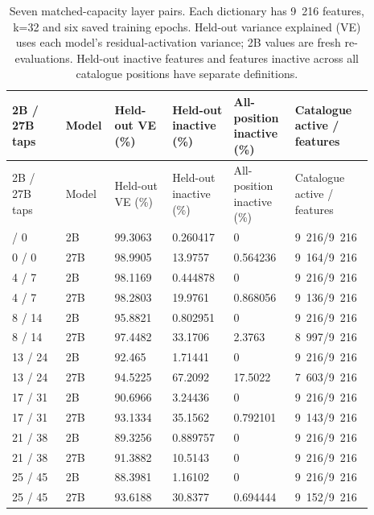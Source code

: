 \begin{longtable}{@{}L{0.14\linewidth}L{0.08\linewidth}L{0.15\linewidth}L{0.16\linewidth}L{0.16\linewidth}L{0.2\linewidth}@{}}
\caption{Seven matched-capacity layer pairs. Each dictionary has 9~216 features, k=32 and six saved training epochs. Held-out variance explained (VE) uses each model's residual-activation variance; 2B values are fresh re-evaluations. Held-out inactive features and features inactive across all catalogue positions have separate definitions.}\\
\toprule
2B / 27B taps & Model & Held-out VE (\%) & Held-out inactive (\%) & All-position inactive (\%) & Catalogue active / features \\
\midrule
\endfirsthead
\toprule
2B / 27B taps & Model & Held-out VE (\%) & Held-out inactive (\%) & All-position inactive (\%) & Catalogue active / features \\
\midrule
\endhead
\endfoot
\bottomrule
{} / 0 & 2B & 99.3063 & 0.260417 & 0 & 9~216/9~216 \\
0 / 0 & 27B & 98.9905 & 13.9757 & 0.564236 & 9~164/9~216 \\
4 / 7 & 2B & 98.1169 & 0.444878 & 0 & 9~216/9~216 \\
4 / 7 & 27B & 98.2803 & 19.9761 & 0.868056 & 9~136/9~216 \\
8 / 14 & 2B & 95.8821 & 0.802951 & 0 & 9~216/9~216 \\
8 / 14 & 27B & 97.4482 & 33.1706 & 2.3763 & 8~997/9~216 \\
13 / 24 & 2B & 92.465 & 1.71441 & 0 & 9~216/9~216 \\
13 / 24 & 27B & 94.5225 & 67.2092 & 17.5022 & 7~603/9~216 \\
17 / 31 & 2B & 90.6966 & 3.24436 & 0 & 9~216/9~216 \\
17 / 31 & 27B & 93.1334 & 35.1562 & 0.792101 & 9~143/9~216 \\
21 / 38 & 2B & 89.3256 & 0.889757 & 0 & 9~216/9~216 \\
21 / 38 & 27B & 91.3882 & 10.5143 & 0 & 9~216/9~216 \\
25 / 45 & 2B & 88.3981 & 1.16102 & 0 & 9~216/9~216 \\
25 / 45 & 27B & 93.6188 & 30.8377 & 0.694444 & 9~152/9~216 \\
\end{longtable}
